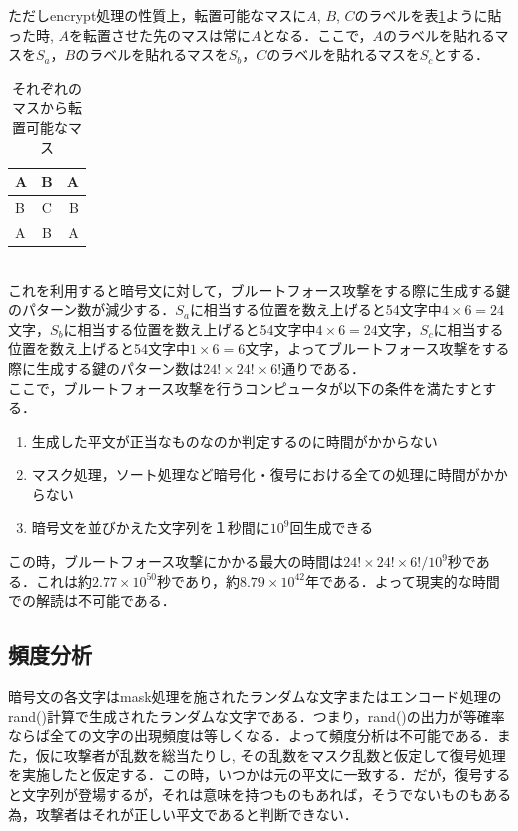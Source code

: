 \documentclass[a4j,titlepage]{jsarticle}
\begin{document}
ただしencrypt処理の性質上，転置可能なマスに\(A\), \(B\), \(C\)のラベルを表\ref{fig:trans-masu}ように貼った時, \(A\)を転置させた先のマスは常に\(A\)となる．ここで，\(A\)のラベルを貼れるマスを\(S_a\)，\(B\)のラベルを貼れるマスを\(S_b\)，\(C\)のラベルを貼れるマスを\(S_c\)とする．
\begin{table}[htb]
  \centering
  \begin{tabular}{|l|c|r|} \hline
    A & B & A \\ \hline
    B & C & B \\ \hline
    A & B & A \\ \hline
  \end{tabular}
  \caption{それぞれのマスから転置可能なマス}
  \label{fig:trans-masu}
\end{table}\\
これを利用すると暗号文に対して，ブルートフォース攻撃をする際に生成する鍵のパターン数が減少する．\(S_a\)に相当する位置を数え上げると54文字中\(4\times6=24\)文字，\(S_b\)に相当する位置を数え上げると54文字中\(4\times6=24\)文字，\(S_c\)に相当する位置を数え上げると54文字中\(1\times6=6\)文字，よってブルートフォース攻撃をする際に生成する鍵のパターン数は\(24!\times24!\times6!\)通りである．\\
ここで，ブルートフォース攻撃を行うコンピュータが以下の条件を満たすとする．
\begin{enumerate}
  \item 生成した平文が正当なものなのか判定するのに時間がかからない
  \item マスク処理，ソート処理など暗号化・復号における全ての処理に時間がかからない
  \item 暗号文を並びかえた文字列を１秒間に\(10^9\)回生成できる
\end{enumerate}
この時，ブルートフォース攻撃にかかる最大の時間は\(24! \times 24! \times 6!/10^9\)秒である．これは約\(2.77 \times 10^{50}\)秒であり，約\(8.79 \times 10^{42}\)年である．よって現実的な時間での解読は不可能である．

\subsection{頻度分析}
暗号文の各文字はmask処理を施されたランダムな文字またはエンコード処理のrand()計算で生成されたランダムな文字である．つまり，rand()の出力が等確率ならば全ての文字の出現頻度は等しくなる．よって頻度分析は不可能である．また，仮に攻撃者が乱数を総当たりし, その乱数をマスク乱数と仮定して復号処理を実施したと仮定する．この時，いつかは元の平文に一致する．だが，復号すると文字列が登場するが，それは意味を持つものもあれば，そうでないものもある為，攻撃者はそれが正しい平文であると判断できない．
\end{document}
